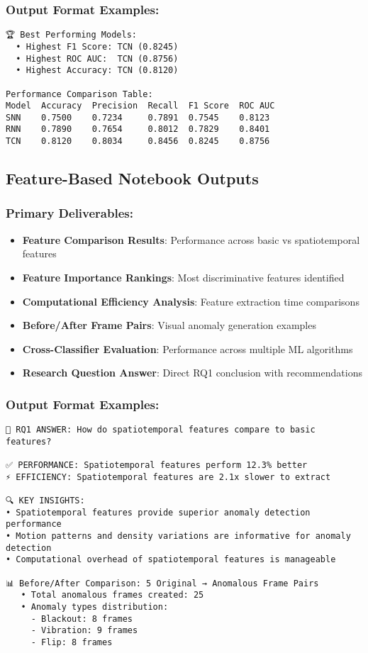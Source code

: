 \documentclass[11pt,a4paper]{article}
\begin{document}
\subsubsection{Output Format Examples:}
\begin{lstlisting}[caption=Architecture-Based Output Sample]
🏆 Best Performing Models:
  • Highest F1 Score: TCN (0.8245)
  • Highest ROC AUC:  TCN (0.8756)
  • Highest Accuracy: TCN (0.8120)

Performance Comparison Table:
Model  Accuracy  Precision  Recall  F1 Score  ROC AUC
SNN    0.7500    0.7234     0.7891  0.7545    0.8123
RNN    0.7890    0.7654     0.8012  0.7829    0.8401
TCN    0.8120    0.8034     0.8456  0.8245    0.8756
\end{lstlisting}

\subsection{Feature-Based Notebook Outputs}

\subsubsection{Primary Deliverables:}
\begin{itemize}
    \item \textbf{Feature Comparison Results}: Performance across basic vs spatiotemporal features
    \item \textbf{Feature Importance Rankings}: Most discriminative features identified
    \item \textbf{Computational Efficiency Analysis}: Feature extraction time comparisons
    \item \textbf{Before/After Frame Pairs}: Visual anomaly generation examples
    \item \textbf{Cross-Classifier Evaluation}: Performance across multiple ML algorithms
    \item \textbf{Research Question Answer}: Direct RQ1 conclusion with recommendations
\end{itemize}

\subsubsection{Output Format Examples:}
\begin{lstlisting}[caption=Feature-Based Output Sample]
🎯 RQ1 ANSWER: How do spatiotemporal features compare to basic features?

✅ PERFORMANCE: Spatiotemporal features perform 12.3% better
⚡ EFFICIENCY: Spatiotemporal features are 2.1x slower to extract

🔍 KEY INSIGHTS:
• Spatiotemporal features provide superior anomaly detection performance
• Motion patterns and density variations are informative for anomaly detection
• Computational overhead of spatiotemporal features is manageable

📊 Before/After Comparison: 5 Original → Anomalous Frame Pairs
   • Total anomalous frames created: 25
   • Anomaly types distribution:
     - Blackout: 8 frames
     - Vibration: 9 frames
     - Flip: 8 frames
\end{lstlisting}
\end{document}
